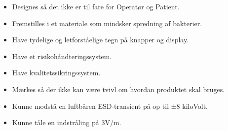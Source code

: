 \begin{itemize}
\item Designes så det ikke er til fare for Operatør og Patient. 
\item Fremstilles i et materiale som mindsker spredning af bakterier. 
\item Have tydelige og letforståelige tegn på knapper og display.
\item Have et risikohåndteringssystem.
\item Have kvalitetssikringssystem. 
\item Mærkes så der ikke kan være tvivl om hvordan produktet skal bruges.
\item Kunne modstå en luftbåren ESD-transient på op til ±8 kiloVolt.
\item Kunne tåle en indstråling på 3V/m.
\end{itemize}